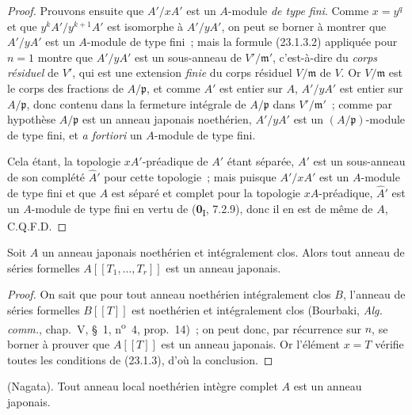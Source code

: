 \begin{proof}
Prouvons ensuite que $A'/xA'$ est un $A$-module \emph{de type fini}. Comme $x=y^q$
et que $y^kA'/y^{k+1}A'$ est isomorphe à $A'/yA'$, on peut se borner à
montrer que $A'/yA'$ est un $A$-module de type fini~; mais la formule
(23.1.3.2) appliquée pour $n=1$ montre que $A'/yA'$ est un sous-anneau de
$V'/\mathfrak m'$, c'est-à-dire du \emph{corps résiduel} de $V'$, qui est une
extension \emph{finie} du corps résiduel $V/\mathfrak m$ de $V$. Or
$V/\mathfrak m$ est le corps des fractions de $A/\mathfrak p$, et comme
$A'$ est entier sur $A$, $A'/yA'$ est entier sur $A/\mathfrak p$, donc
contenu dans la fermeture intégrale de $A/\mathfrak p$ dans
$V'/\mathfrak m'$~; comme par hypothèse $A/\mathfrak p$ est un anneau
japonais noethérien, $A'/yA'$ est un $(A/\mathfrak p)$-module de type fini,
et \emph{a fortiori} un $A$-module de type fini.

Cela étant, la topologie $xA'$-préadique de $A'$ étant séparée, $A'$ est un
sous-anneau de son complété $\widehat{A}'$ pour cette topologie~; mais puisque
$A'/xA'$ est un $A$-module de type fini et que $A$ est séparé et complet pour
la topologie $xA$-préadique, $\widehat{A}'$ est un $A$-module de type fini en
vertu de (\textbf{0}\textsubscript{I}, 7.2.9), donc il en est de même de $A$, C.Q.F.D.
\end{proof}

\begin{corollary}[23.1.4]
\label{0.23.1.4-fr}
Soit $A$ un anneau japonais noethérien et intégralement clos. Alors tout
anneau de séries formelles $A[[T_1,\ldots,T_r]]$ est un anneau japonais.
\end{corollary}

\begin{proof}
On sait que pour tout anneau noethérien intégralement clos $B$, l'anneau de
séries formelles $B[[T]]$ est noethérien et intégralement clos (Bourbaki,
\emph{Alg. comm.}, chap.~V, §~1, n\textsuperscript{o}~4, prop.~14)~; on peut
donc, par récurrence sur $n$, se borner à prouver que $A[[T]]$ est un anneau
japonais. Or l'élément $x=T$ vérifie toutes les conditions de (23.1.3), d'où
la conclusion.
\end{proof}

\begin{theorem}[23.1.5]
\label{0.23.1.5-fr}
\textnormal{(Nagata).} Tout anneau local noethérien intègre \textup{complet} $A$ est
un anneau japonais.
\end{theorem}

